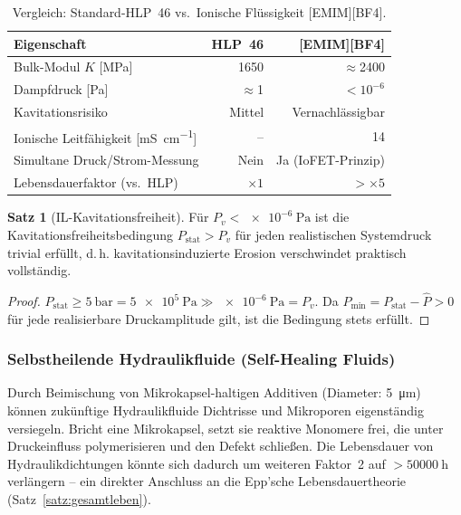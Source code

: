 ﻿\documentclass[a4paper,12pt]{scrreprt}
\theoremstyle{definition}
\newtheorem{satz}{Satz}[section]
\begin{document}
\begin{table}[H]
\centering
\caption{Vergleich: Standard-HLP~46 vs.\ Ionische Flüssigkeit [EMIM][BF4].}
\label{tab:il_vergleich}
\small
\begin{tabular}{|l|r|r|}
\hline
\rowcolor{iofetblue!15}
\textbf{Eigenschaft} & \textbf{HLP~46} & \textbf{[EMIM][BF4]} \\
\hline
Bulk-Modul $K$ [\si{\mega\pascal}] & 1650 & $\approx$2400 \\
\hline
Dampfdruck [\si{\pascal}] & $\approx$1 & $< 10^{-6}$ \\
\hline
Kavitationsrisiko & Mittel & Vernachlässigbar \\
\hline
Ionische Leitfähigkeit [\si{\milli\siemens\per\centi\meter}] & -- & 14 \\
\hline
Simultane Druck/Strom-Messung & Nein & Ja (IoFET-Prinzip) \\
\hline
Lebensdauerfaktor (vs.\ HLP) & $\times 1$ & $> \times 5$ \\
\hline
\end{tabular}
\end{table}

\begin{satz}[IL-Kavitationsfreiheit]
\label{satz:il_kavfrei}
Für $P_v < \SI{e-6}{\pascal}$ ist die Kavitationsfreiheitsbedingung
$P_{\text{stat}} > P_v$ für jeden realistischen Systemdruck trivial
erfüllt, d.\,h. kavitationsinduzierte Erosion verschwindet praktisch
vollständig.
\end{satz}

\begin{proof}
$P_{\text{stat}} \geq \SI{5}{\bar} = \SI{5e5}{\pascal} \gg \SI{e-6}{\pascal} = P_v$.
Da $P_{\min} = P_{\text{stat}} - \hat{P} > 0$ für jede realisierbare
Druckamplitude gilt, ist die Bedingung stets erfüllt.
\end{proof}

\subsubsection{Selbstheilende Hydraulikfluide (Self-Healing Fluids)}

Durch Beimischung von Mikrokapsel-haltigen Additiven (Diameter: \SI{5}{\micro\meter})
können zukünftige Hydraulikfluide Dichtrisse und
Mikroporen eigenständig versiegeln. Bricht eine Mikrokapsel,
setzt sie reaktive Monomere frei, die unter Druckeinfluss
polymerisieren und den Defekt schließen. Die Lebensdauer
von Hydraulikdichtungen könnte sich dadurch um weiteren Faktor~2
auf $> \SI{50000}{\hour}$ verlängern -- ein direkter Anschluss
an die Epp'sche Lebensdauertheorie (Satz~\ref{satz:gesamtleben}).
\end{document}
